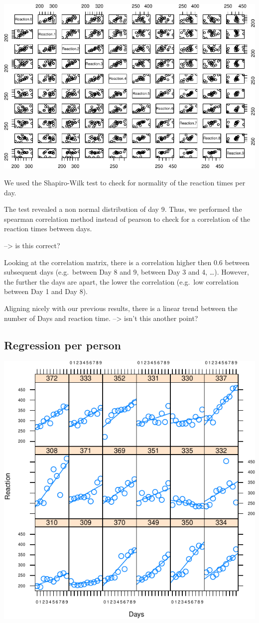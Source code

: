 \documentclass[
]{article}
\begin{document}
\begin{center}\includegraphics[width=0.8\linewidth]{Common_sleep_files/figure-latex/spearman-1} \end{center}

We used the Shapiro-Wilk test to check for normality of the reaction
times per day.

The test revealed a non normal distribution of day 9. Thus, we performed
the spearman correlation method instead of pearson to check for a
correlation of the reaction times between days.

--\textgreater{} is this correct?

Looking at the correlation matrix, there is a correlation higher then
0.6 between subsequent days (e.g.~between Day 8 and 9, between Day 3 and
4, \ldots). However, the further the days are apart, the lower the
correlation (e.g.~low correlation between Day 1 and Day 8).

Aligning nicely with our previous results, there is a linear trend
between the number of Days and reaction time. --\textgreater{} isn't
this another point?

\hypertarget{regression-per-person}{%
\subsection{Regression per person}\label{regression-per-person}}

\begin{center}\includegraphics[width=0.8\linewidth]{Common_sleep_files/figure-latex/trellis-1} \end{center}
\end{document}
